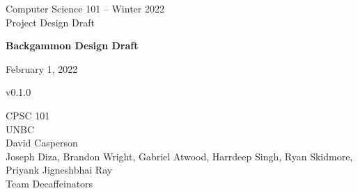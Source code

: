 \begin{titlepage}
    \begin{center}
        \vspace{1.5cm}
        
        \Large
        Computer Science 101 -- Winter 2022 \\
        Project Design Draft
        
        \vspace*{4cm}
            
        \huge
        \textbf{Backgammon Design Draft}
        \vspace*{0.4cm}

        \large
        February 1, 2022 \\
        \vspace*{0.2cm}

        \footnotesize
        v0.1.0
        \vspace{1.5cm}

        \vfill
        CPSC 101 \\
        UNBC \\
        David Casperson \\

        \vspace{0.8cm}
        Joseph Diza, Brandon Wright, Gabriel Atwood, Harrdeep Singh, Ryan Skidmore, Priyank Jigneshbhai Ray \\
        Team Decaffeinators
    \end{center}
\end{titlepage}
